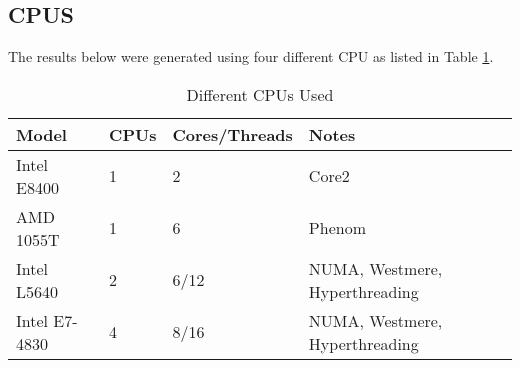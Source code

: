 \pagebreak

\subsection{CPUS}

The results below were generated using four different CPU as listed in Table \ref{table:CPUs}.

\begin{table}[hp]
    \caption{Different CPUs Used}
    \begin{center}
        \begin{tabular}{|l|l|l|l|}
            \hline Model & CPUs & Cores/Threads & Notes  \\
            \hline Intel E8400 & 1 & 2 & Core2  \\
            \hline AMD 1055T & 1 & 6 & Phenom \\
            \hline Intel L5640 & 2 & 6/12 & NUMA, Westmere, Hyperthreading  \\
            \hline Intel E7-4830 & 4 & 8/16 & NUMA, Westmere, Hyperthreading  \\
            \hline
        \end{tabular}
    \end{center}
    \label{table:CPUs}
\end{table}

